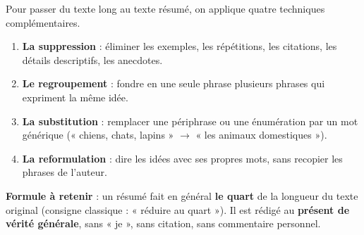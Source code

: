 \documentclass[11pt]{article}
\begin{document}
\begin{methode}
Pour passer du texte long au texte résumé, on applique quatre techniques complémentaires.
\begin{enumerate}
\item \textbf{La suppression} : éliminer les exemples, les répétitions, les citations, les détails descriptifs, les anecdotes.
\item \textbf{Le regroupement} : fondre en une seule phrase plusieurs phrases qui expriment la même idée.
\item \textbf{La substitution} : remplacer une périphrase ou une énumération par un mot générique (« chiens, chats, lapins » $\rightarrow$ « les animaux domestiques »).
\item \textbf{La reformulation} : dire les idées avec ses propres mots, sans recopier les phrases de l'auteur.
\end{enumerate}
\textbf{Formule à retenir} : un résumé fait en général \textbf{le quart} de la longueur du texte original (consigne classique : « réduire au quart »). Il est rédigé au \textbf{présent de vérité générale}, sans « je », sans citation, sans commentaire personnel.
\end{methode}
\end{document}
